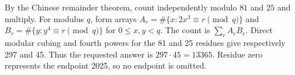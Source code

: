 By the Chinese remainder theorem, count independently modulo $81$ and $25$ and multiply. For modulus $q$, form arrays $A_r=\#\{x:2x^3\equiv r\pmod q\}$ and $B_r=\#\{y:y^4\equiv r\pmod q\}$ for $0\le x,y<q$. The count is $\sum_r A_rB_r$. Direct modular cubing and fourth powers for the 81 and 25 residues give respectively 297 and 45. Thus the requested answer is $297\cdot45=\boxed{13365}$. Residue zero represents the endpoint 2025, so no endpoint is omitted.

